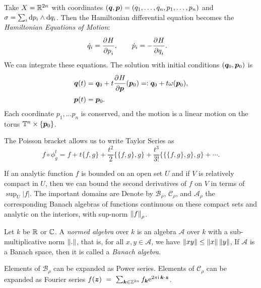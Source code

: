 \documentclass[twoside,letterpaper,10pt]{article}
\begin{document}
\begin{exmp}
  Take $X = \mathbb{R}^{2n}$ with coordinates
  $(\bm{q}, \bm{p}) = (q_1, \ldots, q_n, p_1, \ldots, p_n)$ and
  $\sigma = \sum_i \mathop{}\!\mathrm{d} p_i \wedge \mathop{}\!\mathrm{d} q_i$.
  Then the Hamiltonian differential equation becomes the \emph{Hamiltonian
    Equations of Motion}:
  \begin{align*}
    \dot{q}_i &= \frac{\strut\partial^{}H}{\strut\partial p_i^{}},\qquad \dot{p}_i = -\frac{\strut\partial^{}H}{\strut\partial q_i^{}}.
  \end{align*}
  We can integrate these equations.
  The solution with initial conditions $(\bm{q}_0, \bm{p}_0)$ is
  \begin{align*}
    \bm{q}(t) &= \bm{q}_0 + t \frac{\strut\partial^{}H}{\strut\partial\bm{p}^{}}(\bm{p}_0) =: \bm{q}_0 + t
                \omega(\bm{p}_0),\\
    \bm{p}(t) &= \bm{p}_0.
  \end{align*}
  Each coordinate $p_1, \ldots p_n$ is conserved, and the motion is a linear
  motion on the torus $\mathbb{T}^n \times \{\bm{p}_0\}$.
\end{exmp}
The Poisson bracket allows us to write Taylor Series as
\begin{equation*}
  f \circ \phi^t_g = f + t \{f, g\} + \frac{t^2}{2} \{ \{f, g\}, g\} +
  \frac{t^3}{3!} \{ \{ \{f, g\}, g\}, g\} + \cdots.
\end{equation*}

\begin{defn}
  \dionumber{}
\end{defn}

\begin{defn}
  \diovector
\end{defn}

If an analytic function $f$ is bounded on an open set $U$ and if $V$ is
relatively compact in $U$, then we can bound the second derivatives of $f$ on
$V$ in terms of $\sup_U |f|$.
The important domains are
\domains{}
Denote by $\mathcal{B}_\rho$,
$\mathcal{C}_\rho$, and $\mathcal{A}_\rho$ the corresponding Banach algebras of
functions continuous on these compact sets and analytic on the interiors, with
sup-norm $\norm{f}_{\rho}$.
\begin{defn}
  Let $k$ be $\mathbb{R}$ or $\mathbb{C}$.
  A \emph{normed algebra} over $k$ is an algebra $\mathcal{A}$ over $k$ with a
  sub-multiplicative norm $\norm{.}$, that is, for all $x, y \in \mathcal{A}$,
  we have $\norm{xy} \leq \norm{x} \norm{y}$,
  If $\mathcal{A}$ is a Banach space, then it is called a \emph{Banach algebra}.
\end{defn}
Elements of $\mathcal{B}_{\rho}$ can be expanded as Power series.
Elements of $\mathcal{C}_{\rho}$ can be expanded as Fourier series
$f(\bm{z})~=~\sum_{\bm{k} \in \mathbb{Z}^{2n}} f_{\bm{k}} \mathrm{e}^{2 \pi \mathrm{i} \, \bm{k} \cdot
  \bm{z}}$.
\end{document}
